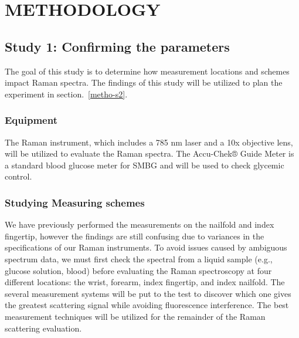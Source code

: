 \setlength{\footskip}{8mm}

\chapter{METHODOLOGY}\label{methodology}

\section{Study 1: Confirming the parameters}\label{metho-s1}

The goal of this study is to determine how measurement locations and schemes impact Raman spectra.
The findings of this study will be utilized to plan the experiment in section.~\ref{metho-s2}.

\subsection{Equipment}
The Raman instrument, which includes a 785 nm laser and a 10x objective lens, will be utilized to evaluate the Raman spectra.
The Accu-Chek® Guide Meter is a standard blood glucose meter for SMBG \citep{accu2022} and will be used to check glycemic control.

\subsection{Studying Measuring schemes}
We have previously performed the measurements on the nailfold and index fingertip, however the findings are still confusing due to variances in the specifications of our Raman instruments.
To avoid issues caused by ambiguous spectrum data, we must first check the spectral from a liquid sample (e.g., glucose solution, blood) before evaluating the Raman spectroscopy at four different locations: the wrist, forearm, index fingertip, and index nailfold.
The several measurement systems will be put to the test to discover which one gives the greatest scattering signal while avoiding fluorescence interference.
The best measurement techniques will be utilized for the remainder of the Raman scattering evaluation.


